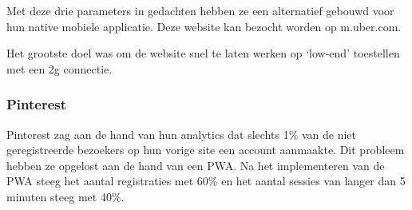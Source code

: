 		Met deze drie parameters in gedachten hebben ze een alternatief gebouwd voor hun native mobiele applicatie. Deze website kan bezocht worden op m.uber.com.
		
		Het grootste doel was om de website snel te laten werken op ‘low-end’ toestellen met een 2g connectie. 
		
		\autocite{Croll2017}
	
	\subsubsection{Pinterest}
	
		Pinterest zag aan de hand van hun analytics dat slechts 1\% van de niet geregistreerde bezoekers op hun vorige site een account aanmaakte. Dit probleem hebben ze opgelost aan de hand van een PWA.
		Na het implementeren van de PWA steeg het aantal registraties met 60\% en het aantal sessies van langer dan 5 minuten steeg met 40\%.
		
		\autocite{Osmani2019b}
	
	


